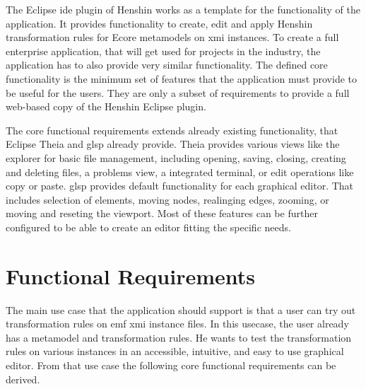   The Eclipse \acs{ide} plugin of Henshin works as a template for the functionality of the application. It provides functionality to create, edit and apply Henshin transformation rules for Ecore metamodels on \ac{xmi} instances. To create a full enterprise application, that will get used for projects in the industry, the application has to also provide very similar functionality.
  The defined core functionality is the minimum set of features that the application must provide to be useful for the users. They are only a subset of requirements to provide a full web-based copy of the Henshin Eclipse plugin.

  The core functional requirements extends already existing functionality, that Eclipse Theia and \ac{glsp} already provide. Theia provides various views like the explorer for basic file management, including opening, saving, closing, creating and deleting files, a problems view, a integrated terminal, or edit operations like copy or paste. \ac{glsp} provides default functionality for each graphical editor. That includes selection of elements, moving nodes, realinging edges, zooming, or moving and reseting the viewport. Most of these features can be further configured to be able to create an editor fitting the specific needs.

  \section{Functional Requirements}
  \label{subsec:functional-requirements}

  The main use case that the application should support is that a user can try out transformation rules on \ac{emf} \ac{xmi} instance files. In this usecase, the user already has a metamodel and transformation rules. He wants to test the transformation rules on various instances in an accessible, intuitive, and easy to use graphical editor. From that use case the following core functional requirements can be derived.

